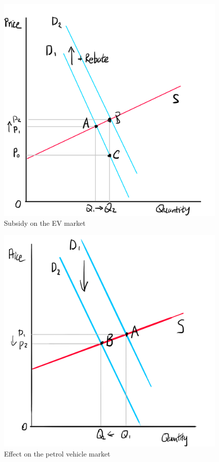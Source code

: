 \documentclass[a4paper,12pt]{article}
\begin{document}
\begin{figure}
    \centering
    \includegraphics[scale=0.5]{rebate.png}
    \caption{Subsidy on the EV market}
    \label{fig:sub}
\end{figure}

\begin{figure}
    \centering
    \includegraphics[scale=0.5]{petrol.png}
    \caption{Effect on the petrol vehicle market}
    \label{fig:subpe}
\end{figure}
\end{document}
